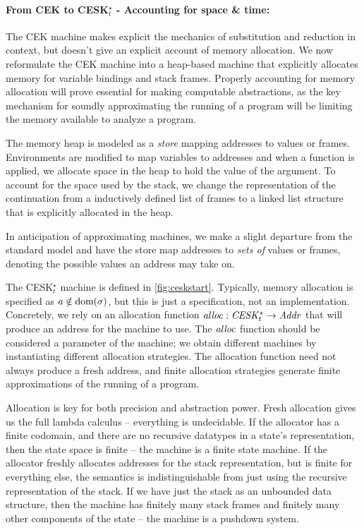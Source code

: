 \paragraph{From CEK to CESK$_t^\star$ - Accounting for space \& time:}

The CEK machine makes explicit the mechanics of substitution and
reduction in context, but doesn't give an explicit account of memory
allocation.  We now reformulate the CEK machine into a heap-based
machine that explicitly allocates memory for variable bindings and
stack frames.  Properly accounting for memory allocation will prove
essential for making computable abstractions, as the key mechanism for
soundly approximating the running of a program will be limiting the
memory available to analyze a program.

The memory heap is modeled as a \emph{store} mapping addresses to
values or frames.  Environments are modified to map variables to
addresses and when a function is applied, we allocate space in the
heap to hold the value of the argument.
%
To account for the space used by the stack, we change the
representation of the continuation from a inductively defined list of
frames to a linked list structure that is explicitly allocated in the
heap.

In anticipation of approximating machines, we make a slight
departure from the standard model and have the store map addresses to
\emph{sets of} values or frames, denoting the possible values an address may take on.


The CESK$_t^\star$ machine is defined in \autoref{fig:ceskstart}.
%
%
Typically, memory allocation is specified as $a \notin \text{dom}(\sigma)$, but this is just a specification, not an implementation.
%
Concretely, we rely on an allocation function $\mathit{alloc} : \mathit{CESK^*_t} \to \mathit{Addr}$ that will produce an address for the machine to use.
%
The $\mathit{alloc}$ function should be considered a parameter of the machine; we 
obtain different machines by instantiating different allocation strategies.
%
The allocation function need not always produce a fresh address, and finite
allocation strategies generate finite approximations of the running of a program.


%
Allocation is key for both precision and abstraction power.
%
Fresh allocation gives us the full lambda calculus -- everything is undecidable.
%
If the allocator has a finite codomain, and there are no recursive datatypes in a state's representation, then the state space is finite -- the machine is a finite state machine.
%
If the allocator freshly allocates addresses for the stack representation, but is finite for everything else, the semantics is indistinguishable from just using the recursive representation of the stack.
%
If we have just the stack as an unbounded data structure, then the machine has finitely many stack frames and finitely many other components of the state -- the machine is a pushdown system.
%

